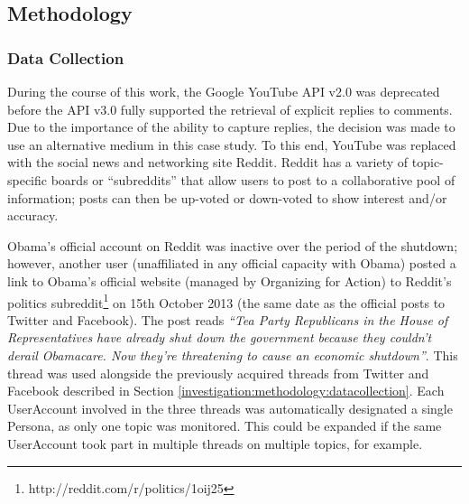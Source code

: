 \subsection{Methodology}

\subsubsection{Data Collection}
During the course of this work, the Google YouTube API v2.0 was deprecated before the API v3.0 fully supported the retrieval of explicit replies to comments. Due to the importance of the ability to capture replies, the decision was made to use an alternative medium in this case study. To this end, YouTube was replaced with the social news and networking site Reddit. Reddit has a variety of topic-specific boards or ``subreddits'' that allow users to post to a collaborative pool of information; posts can then be up-voted or down-voted to show interest and/or accuracy.

Obama's official account on Reddit was inactive over the period of the shutdown; however, another user (unaffiliated in any official capacity with Obama) posted a link to Obama's official website (managed by Organizing for Action) to Reddit's politics subreddit\footnote{http://reddit.com/r/politics/1oij25} on 15th October 2013 (the same date as the official posts to Twitter and Facebook). The post reads \textit{``Tea Party Republicans in the House of Representatives have already shut down the government because they couldn't derail Obamacare. Now they're threatening to cause an economic shutdown''}. This thread was used alongside the previously acquired threads from Twitter and Facebook described in Section \ref{investigation:methodology:datacollection}. Each UserAccount involved in the three threads was automatically designated a single Persona, as only one topic was monitored. This could be expanded if the same UserAccount took part in multiple threads on multiple topics, for example.


